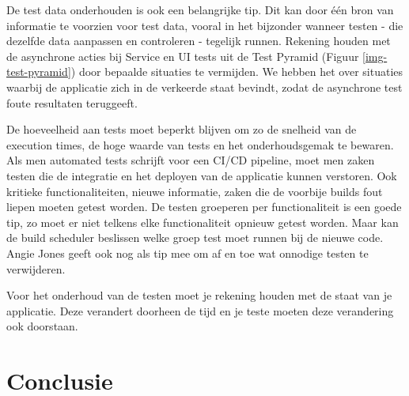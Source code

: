 De test data onderhouden is ook een belangrijke tip. Dit kan door één bron van informatie te voorzien voor test data, vooral in het bijzonder wanneer testen - die dezelfde data aanpassen en controleren - tegelijk runnen. Rekening houden met de asynchrone acties bij Service en UI tests uit de Test Pyramid (Figuur \ref{img-test-pyramid}) door bepaalde situaties te vermijden. We hebben het over situaties waarbij de applicatie zich in de verkeerde staat bevindt, zodat de asynchrone test foute resultaten teruggeeft.

De hoeveelheid aan tests moet beperkt blijven om zo de snelheid van de execution times, de hoge waarde van tests en het onderhoudsgemak te bewaren.
Als men automated tests schrijft voor een CI/CD pipeline, moet men zaken testen die de integratie en het deployen van de applicatie kunnen verstoren.
Ook kritieke functionaliteiten, nieuwe informatie, zaken die de voorbije builds fout liepen moeten getest worden. 
De testen groeperen per functionaliteit is een goede tip, zo moet er niet telkens elke functionaliteit opnieuw getest worden. Maar kan de build scheduler beslissen welke groep test moet runnen bij de nieuwe code. 
Angie Jones \textcite{Jones2019} geeft ook nog als tip mee om af en toe wat onnodige testen te verwijderen.

Voor het onderhoud van de testen moet je rekening houden met de staat van je applicatie. Deze verandert doorheen de tijd en je teste moeten deze verandering ook doorstaan.

\section{Conclusie}
\label{sec:conclusie}
